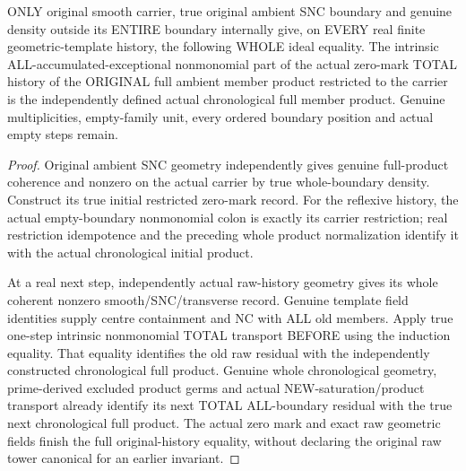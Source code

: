 \begin{theorem}
\label{hir:sharp-actual-original-product-total-history-residual-dictionary}
\leanok
ONLY original smooth carrier, true original ambient SNC boundary and
genuine density outside its ENTIRE boundary internally give, on EVERY
real finite geometric-template history, the following WHOLE ideal
equality. The intrinsic ALL-accumulated-exceptional nonmonomial part of
the actual zero-mark TOTAL history of the ORIGINAL full ambient member
product restricted to the carrier is the independently defined actual
chronological full member product. Genuine multiplicities, empty-family
unit, every ordered boundary position and actual empty steps remain.
\end{theorem}
\begin{proof}
Original ambient SNC geometry independently gives genuine full-product
coherence and nonzero on the actual carrier by true whole-boundary density.
Construct its true initial restricted zero-mark record. For the reflexive
history, the actual empty-boundary nonmonomial colon is exactly its
carrier restriction; real restriction idempotence and the preceding
whole product normalization identify it with the actual chronological
initial product.

At a real next step, independently actual raw-history geometry gives its
whole coherent nonzero smooth/SNC/transverse record. Genuine template
field identities supply centre containment and NC with ALL old members.
Apply true one-step intrinsic nonmonomial TOTAL transport BEFORE using
the induction equality. That equality identifies the old raw residual
with the independently constructed chronological full product. Genuine
whole chronological geometry, prime-derived excluded product germs and
actual NEW-saturation/product transport already identify its next TOTAL
ALL-boundary residual with the true next chronological full product.
The actual zero mark and exact raw geometric fields finish the full
original-history equality, without declaring the original raw tower
canonical for an earlier invariant.
\end{proof}

